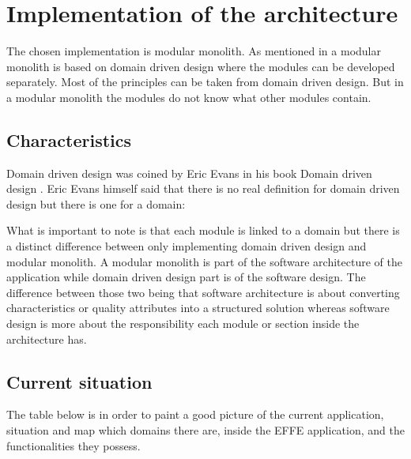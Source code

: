 \chapter{Implementation of the architecture}

The chosen implementation is modular monolith. As mentioned in  a modular monolith is based on domain driven design where the modules can be developed separately. Most of the principles can be taken from domain driven design. But in a modular monolith the modules do not know what other modules contain.

\section{Characteristics}

Domain driven design was coined by Eric Evans in his book Domain driven design \cite{domainDrivenDesign}. Eric Evans himself said that there is no real definition for domain driven design but there is one for a domain:


What is important to note is that each module is linked to a domain but there is a distinct difference between only implementing domain driven design and modular monolith. A modular monolith is part of the software architecture of the application while domain driven design part is of the software design. The difference between those two being that software architecture is about converting characteristics or quality attributes into a structured solution whereas software design is more about the responsibility each module or section inside the architecture has. \cite{softwareArchitectureDefinition}

\section{Current situation}

The table below is in order to paint a good picture of the current application, situation and map which domains there are, inside the EFFE application, and the functionalities they possess.

